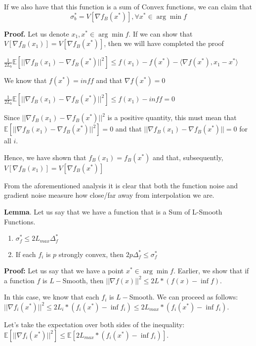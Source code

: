 If we also have that this function is a sum of Convex functions, we can claim that 
\begin{equation}
    \sigma_b^* = V[\nabla f_B(x^*)], \forall x^* \in \arg \min f
\end{equation}

\noindent \textbf{Proof.} Let us denote $x_1, x^* \in \arg \min f$. If we can show that $V[\nabla f_B(x_1)] = V[\nabla f_B(x^*)]$, then we will have completed the proof 

$\frac{1}{2L_{b}} \mathbb{E}[||\nabla f_B(x_1) - \nabla f_B(x^*)||^2] \leq f(x_1) - f(x^*) - \langle \nabla f(x^*), x_1 - x^* \rangle$

We know that $f(x^*) = inf f$ and that $\nabla f(x^*) = 0$ \newline 

$\frac{1}{2L_{b}} \mathbb{E}[||\nabla f_B(x_1) - \nabla f_B(x^*)||^2] \leq f(x_1) - inf f = 0$

Since $||\nabla f_B(x_1) - \nabla f_B(x^*)||^2$ is a positive quantity, this must mean that $\mathbb{E}[||\nabla f_B(x_1) - \nabla f_B(x^*)||^2] = 0$ and that $||\nabla f_B(x_1) - \nabla f_B(x^*)|| = 0$ for all $i$. 

Hence, we have shown that $f_B(x_1) = f_B(x^*)$ and that, subsequently, $V[\nabla f_B(x_1)] = V[\nabla f_B(x^*)]$


\noindent From the aforementioned analysis it is clear that both the function noise and gradient noise measure how close/far away from interpolation we are. 

\noindent \textbf{Lemma}. Let us say that we have a function that is a Sum of L-Smooth Functions. 

\begin{enumerate}
    \item $\sigma_f^* \leq 2L_{max} \Delta^*_f$
    \item If each $f_i$ is $p$ strongly convex, then $2p\Delta^*_f \leq \sigma_f^*$
\end{enumerate}

\noindent \textbf{Proof:} Let us say that we have a point $x^* \in \arg \min f$. Earlier, we show that if a function $f$ is $L-$Smooth, then $||\nabla f(x)||^2 \leq 2L * (f(x) - \inf f)$. 

In this case, we know that each $f_i$ is $L-$Smooth. We can proceed as follows: \newline 
$||\nabla f_i(x^*)||^2 \leq 2L_i * (f_i(x^*) - \inf f_i) \leq 2L_{max} *  (f_i(x^*) - \inf f_i)$. 

Let's take the expectation over both sides of the inequality: \newline 
$\mathbb{E}[||\nabla f_i(x^*)||^2] \leq \mathbb{E}[2L_{max} * (f_i(x^*) - \inf f_i)]$. \newline  

